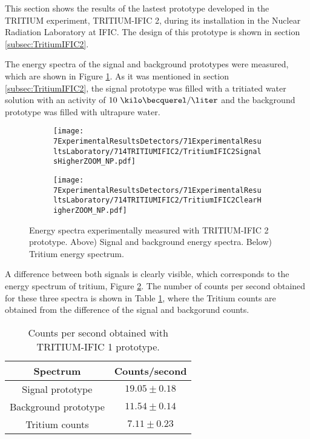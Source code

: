 This section shows the results of the lastest prototype developed in the TRITIUM experiment, TRITIUM-IFIC 2, during its installation in the Nuclear Radiation Laboratory at IFIC. The design of this prototype is shown in section \ref{subsec:TritiumIFIC2}.

The energy spectra of the signal and background prototypes were measured, which are shown in Figure \ref{subfig:SignalBackgroundEnergySpectraTritiumIFIC2}. As it was mentioned in section \ref{subsec:TritiumIFIC2}, the signal prototype was filled with a tritiated water solution with an activity of $10~\kilo\becquerel/\liter$ and the background prototype was filled with ultrapure water.

\begin{figure}
\centering
    \begin{subfigure}[b]{0.73\textwidth}
    \centering
    \texttt{[image: 7ExperimentalResultsDetectors/71ExperimentalResultsLaboratory/714TRITIUMIFIC2/TritiumIFIC2SignalsHigherZOOM\_NP.pdf]}  
    \caption{\label{subfig:SignalBackgroundEnergySpectraTritiumIFIC2}}
    \end{subfigure}
    \hfill
    \begin{subfigure}[b]{0.73\textwidth}
    \centering
    \texttt{[image: 7ExperimentalResultsDetectors/71ExperimentalResultsLaboratory/714TRITIUMIFIC2/TritiumIFIC2ClearHigherZOOM\_NP.pdf]}  
    \caption{\label{subfig:TritiumEnergySpectraTritiumIFIC2}}
    \end{subfigure}
 \caption{Energy spectra experimentally measured with TRITIUM-IFIC 2 prototype. Above) Signal and background energy spectra. Below) Tritium energy spectrum.}
 \label{fig:EnergySpectraTRITIUMIFIC2}
\end{figure}

A difference between both signals is clearly visible, which corresponds to the energy spectrum of tritium, Figure \ref{subfig:TritiumEnergySpectraTritiumIFIC2}. The number of counts per second obtained for these three spectra is shown in Table \ref{tab:CountsPerSecondTRITIUMIFIC2}, where the Tritium counts are obtained from the difference of the signal and backgorund counts.

\begin{table}[h]
\begin{center}
\begin{tabular}{|c|c|}
\hline
Spectrum & Counts/second\\
\hline \hline \hline
Signal prototype & $19.05 \pm 0.18$ \\ \hline
Background prototype & $11.54 \pm 0.14$ \\ \hline
Tritium counts & $7.11 \pm 0.23$ \\ \hline
\end{tabular}
\caption{Counts per second obtained with TRITIUM-IFIC 1 prototype.}
\label{tab:CountsPerSecondTRITIUMIFIC2}
\end{center}
\end{table}

